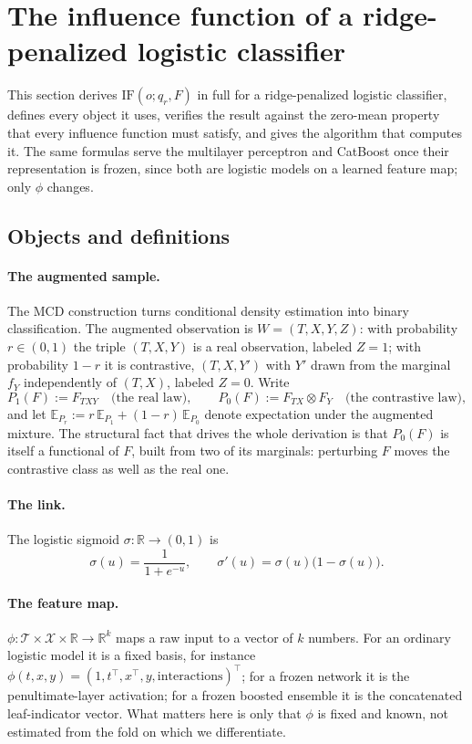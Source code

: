 \documentclass[11pt]{article}
\newcommand{\Eb}{\mathbb{E}}
\newcommand{\Tset}{\mathcal{T}}
\newcommand{\Xset}{\mathcal{X}}
\newcommand{\IF}{\mathrm{IF}}
\begin{document}
\section{The influence function of a ridge-penalized logistic classifier}
\label{sec:if-logistic}

This section derives $\IF(o;q_r,F)$ in full for a ridge-penalized logistic
classifier, defines every object it uses, verifies the result against the zero-mean
property that every influence function must satisfy, and gives the algorithm that
computes it. The same formulas serve the multilayer perceptron and CatBoost once
their representation is frozen, since both are logistic models on a learned feature
map; only $\phi$ changes.

\subsection{Objects and definitions}
\label{sec:objects}

\paragraph{The augmented sample.}
The MCD construction turns conditional density estimation into binary classification.
The augmented observation is $W=(T,X,Y,Z)$: with probability $r\in(0,1)$ the triple
$(T,X,Y)$ is a real observation, labeled $Z=1$; with probability $1-r$ it is
contrastive, $(T,X,Y')$ with $Y'$ drawn from the marginal $f_Y$ independently of
$(T,X)$, labeled $Z=0$. Write
\[
P_1(F) := F_{TXY} \quad\text{(the real law)},
\qquad
P_0(F) := F_{TX}\otimes F_Y \quad\text{(the contrastive law)},
\]
and let $\Eb_{P_r}:=r\,\Eb_{P_1}+(1-r)\,\Eb_{P_0}$ denote expectation under the
augmented mixture. The structural fact that drives the whole derivation is that
$P_0(F)$ is itself a functional of $F$, built from two of its marginals: perturbing
$F$ moves the contrastive class as well as the real one.

\paragraph{The link.}
The logistic sigmoid $\sigma:\mathbb{R}\to(0,1)$ is
\[
\sigma(u)=\frac{1}{1+e^{-u}},
\qquad
\sigma'(u)=\sigma(u)\big(1-\sigma(u)\big).
\]

\paragraph{The feature map.}
$\phi:\Tset\times\Xset\times\mathbb{R}\to\mathbb{R}^k$ maps a raw input to a vector of
$k$ numbers. For an ordinary logistic model it is a fixed basis, for instance
$\phi(t,x,y)=(1,t^\top,x^\top,y,\text{interactions})^\top$; for a frozen network it is
the penultimate-layer activation; for a frozen boosted ensemble it is the
concatenated leaf-indicator vector. What matters here is only that $\phi$ is fixed and
known, not estimated from the fold on which we differentiate.
\end{document}
